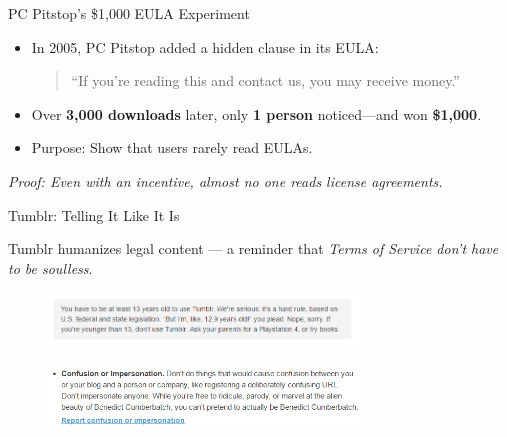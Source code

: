 \begin{frame}{PC Pitstop's \$1,000 EULA Experiment}
\begin{itemize}
    \item In 2005, PC Pitstop added a hidden clause in its EULA:
    \begin{quote}
        “If you’re reading this and contact us, you may receive money.”
    \end{quote}
    \item Over \textbf{3,000 downloads} later, only \textbf{1 person} noticed—and won \textbf{\$1,000}.
    \item Purpose: Show that users rarely read EULAs.
\end{itemize}

\vspace{0.3cm}
\textit{Proof: Even with an incentive, almost no one reads license agreements.\cite{MONEY}}
\end{frame}

\begin{frame}{Tumblr: Telling It Like It Is}

Tumblr humanizes legal content — a reminder that \textit{Terms of Service don’t have to be soulless}.
    \begin{figure}
        \centering
        \includegraphics[width=0.75\textwidth]{images/kids.png}
        \label{fig:kids}
    \end{figure}  
    \begin{figure}
        \centering
        \includegraphics[width=0.75\textwidth]{images/impersonate.png}
        \label{fig:impersonate}
    \end{figure}    
\end{frame}


